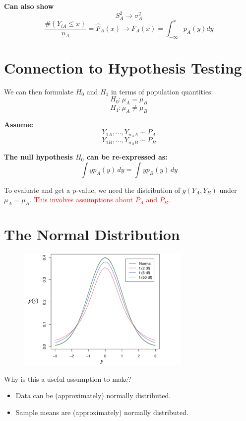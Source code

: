 \documentclass[14pt]{extarticle}
\begin{document}
\textbf{Can also show}
\[
S_A^2 \to \sigma_A^2
\]
\[
\frac{\# \left\{ Y_{iA} \leq x \right\}}{n_A} = \hat{F}_A(x) \to F_A(x) = \int_{-\infty}^x p_A(y) dy
\]

\section*{Connection to Hypothesis Testing}
We can then formulate \( H_0 \) and \( H_1 \) in terms of population quantities:
\[
H_0: \mu_A = \mu_B
\]
\[
H_1: \mu_A \neq \mu_B
\]

\textbf{Assume:}
\[
Y_{1A}, \dots, Y_{n_A A} \sim P_A
\]
\[
Y_{1B}, \dots, Y_{n_B B} \sim P_B
\]

\textbf{The null hypothesis \( H_0 \) can be re-expressed as:}
\[
\int y p_A(y) \, dy = \int y p_B(y) \, dy
\]

To evaluate and get a p-value, we need the distribution of \( g(Y_A, Y_B) \) under \( \mu_A = \mu_B \). 
\textcolor{red}{This involves assumptions about \( P_A \) and \( P_B \).}

\section*{The Normal Distribution}

\begin{figure}[h]
    \centering
    \includegraphics[width=0.75\textwidth]{fig1.png}
\end{figure}

Why is this a useful assumption to make?

\begin{itemize}
    \item Data can be (approximately) normally distributed.
    \item Sample means are (approximately) normally distributed.
\end{itemize}
\end{document}
